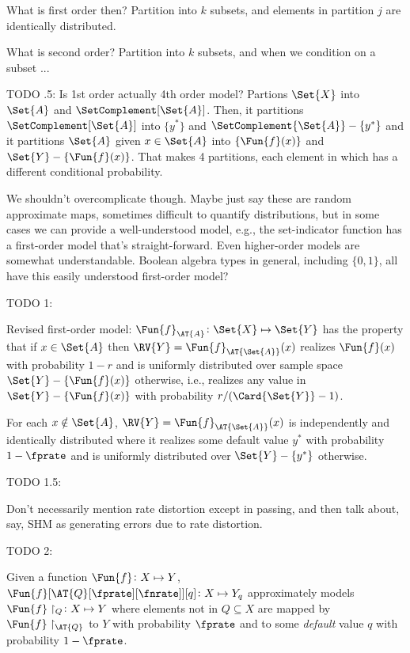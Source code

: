 \documentclass[ ../main.tex]{subfiles}
\begin{document}
What is first order then? Partition into $k$ subsets, and elements in partition $j$ are identically distributed.

What is second order? Partition into $k$ subsets, and when we condition on a subset ...

TODO .5: 
Is 1st order actually 4th order model? Partions $\Set{X}$ into $\Set{A}$ and $\SetComplement[\Set{A}]$. Then, it partitions $\SetComplement[\Set{A}]$ into $\{y^*\}$ and $\SetComplement{\Set{A}} - \{y^*\}$ and it partitions $\Set{A}$ given $x \in \Set{A}$ into $\{\Fun{f}(x)\}$ and $\Set{Y} - \{\Fun{f}(x)\}$. That makes 4 partitions, each element in which has a different conditional probability.

We shouldn't overcomplicate though. Maybe just say these are random approximate maps, sometimes difficult to quantify distributions, but in some cases we can provide a well-understood model, e.g., the set-indicator function has a first-order model that's straight-forward. Even higher-order models are somewhat understandable. Boolean algebra types in general, including $\{0,1\}$, all have this easily understood first-order model?



TODO 1:

Revised first-order model: $\Fun{f}_{\AT{A}} \colon \Set{X} \mapsto \Set{Y}$ has the property that if $x \in \Set{A}$ then $\RV{Y} = \Fun{f}_{\AT{\Set{A}}}(x)$ realizes $\Fun{f}(x)$ with probability $1-r$ and is uniformly distributed over sample space $\Set{Y} - \{\Fun{f}(x)\}$ otherwise, i.e., realizes any value in $\Set{Y} - \{\Fun{f}(x)\}$ with probability $r / (\Card{\Set{Y}}-1)$.

For each $x \notin \Set{A}$, $\RV{Y} = \Fun{f}_{\AT{\Set{A}}}(x)$ is independently and identically distributed where it realizes some default value $y^*$ with probability $1-\fprate$ and is uniformly distributed over $\Set{Y} - \{y^*\}$ otherwise.

TODO 1.5:

Don't necessarily mention rate distortion except in passing, and then talk about, say, SHM as generating errors due to rate distortion.


TODO 2:

Given a function $\Fun{f} \colon X \mapsto Y$, $\Fun{f}[\AT{Q}[\fprate][\fnrate]][q] \colon X \mapsto Y_q$ approximately models $\Fun{f} \restriction_{Q} \colon X \mapsto Y$ where elements not in $Q \subseteq X$ are mapped by $\Fun{f} \restriction_{\AT{Q}}$ to $Y$ with probability $\fprate$ and to some \emph{default} value $q$ with probability $1-\fprate$.
\end{document}

